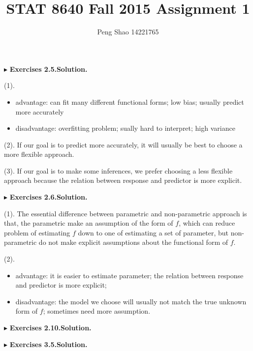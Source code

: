 \documentclass[letterpaper, 10pt]{article}\usepackage[]{graphicx}\usepackage[]{color}
\begin{document}
\title{STAT 8640 Fall 2015 Assignment 1}
\author{Peng Shao 14221765}
\maketitle
\indent







$\blacktriangleright$ \textbf{Exercises 2.5.\quad Solution.} 

(1). \begin{itemize}
\item advantage: can fit many different functional forms; low bias; usually predict more accurately
\item disadvantage: overfitting problem; sually hard to interpret; high variance
\end{itemize}

(2). If our goal is to predict more accurately, it will usually be best to choose a more flexible approach.

(3). If our goal is to make some inferences, we prefer choosing a less flexible approach because the relation between response and predictor is more explicit.

$\blacktriangleright$ \textbf{Exercises 2.6.\quad Solution.} 

(1). The essential difference between parametric and non-parametric approach is that, the parametric make an assumption of the form of $f$, which can reduce problem of estimating $f$ down to one of estimating a set of parameter, but non-parametric do not make explicit assumptions about the functional form of $f$.


(2). \begin{itemize}
\item advantage: it is easier to estimate parameter; the relation between response and predictor is more explicit; 
\item disadvantage: the model we choose will usually not match the true unknown form of $f$; sometimes need more assumption.
\end{itemize}






$\blacktriangleright$ \textbf{Exercises 2.10.\quad Solution.} 



$\blacktriangleright$ \textbf{Exercises 3.5.\quad Solution.} 
\end{document}
